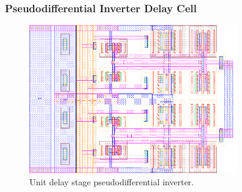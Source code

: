 			\subsubsection{Pseudodifferential Inverter Delay Cell}
				\begin{figure}[htb!]
				        \centering
				        \includegraphics[width=0.8\textwidth, angle=0]{./figs/layout/dly_cell}
				    \caption{Unit delay stage pseudodifferential inverter.}
				\end{figure}
